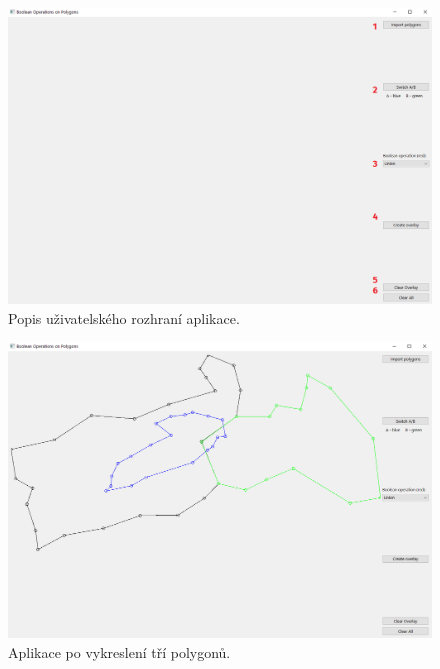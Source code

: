 \documentclass[a4paper, 12pt, oneside, titlepage]{article} %
\begin{document}
\begin{figure}[!htb]
	\centering
	\includegraphics[scale=0.4]{obrazky/popis_aplikace.png} 
	\caption{Popis uživatelského rozhraní aplikace.
	}
	\label{fig:popis_aplikace}
\end{figure} 
\FloatBarrier


\begin{figure}[!htb]
	\centering
	\includegraphics[scale=0.4]{obrazky/start.png} 
	\caption{Aplikace po vykreslení tří polygonů.
	}
	\label{fig:start}
\end{figure} 
\FloatBarrier
\end{document}
